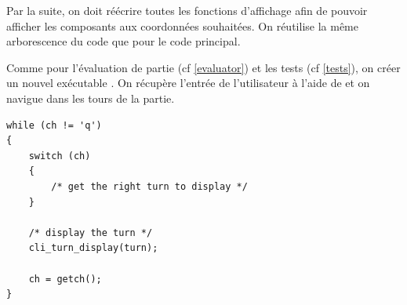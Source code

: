 Par la suite, on doit réécrire toutes les fonctions d'affichage afin de pouvoir afficher les composants aux coordonnées souhaitées. On réutilise la même arborescence du code que pour le code principal.   

Comme pour l'évaluation de partie (cf \ref{evaluator}) et les tests (cf \ref{tests}), on créer un nouvel exécutable . On récupère l'entrée de l'utilisateur à l'aide de  et on navigue dans les tours de la partie.

\begin{lstlisting}[frame=single, caption={Navigation dans les tours de la partie}]
while (ch != 'q')
{
    switch (ch)
    {
        /* get the right turn to display */
    } 
    
    /* display the turn */
    cli_turn_display(turn);

    ch = getch();
}
\end{lstlisting}